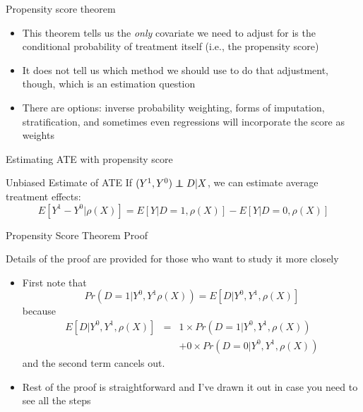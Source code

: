 \documentclass{beamer}
\newcommand\independent{\protect\mathpalette{\protect\independenT}{\perp}}
\def\independenT#1#2{\mathrel{\rlap{$#1#2$}\mkern2mu{#1#2}}}
\begin{document}
\begin{frame}{Propensity score theorem}
	
	\begin{itemize}
	\item This theorem tells us the \emph{only} covariate we need to adjust for is the conditional probability of treatment itself (i.e., the propensity score)
	\item It does not tell us which method we should use to do that adjustment, though, which is an estimation question
	\item There are options: inverse probability weighting, forms of imputation, stratification, and sometimes even regressions will incorporate the score as weights
	\end{itemize}
\end{frame}



\begin{frame}{Estimating ATE with propensity score}

	\begin{block}{Unbiased Estimate of ATE}
	If $(Y^1,Y^0)\independent{D}|X$, we can estimate average treatment effects:
 $$E[Y^1-Y^0|\rho(X)] = E[Y|D=1,\rho(X)] - E[Y|D=0,\rho(X)]$$
	\end{block}


	
\end{frame}


\begin{frame}{Propensity Score Theorem Proof}
	
	 Details of the proof are provided for those who want to study it more closely
	\begin{itemize}
	\item First note that$$Pr(D=1|Y^0,Y^1\rho(X)) = E[D | Y^0,Y^1,\rho(X)]$$because
		\begin{eqnarray*}
		E[D|Y^0,Y^1,\rho(X)] &=& 1\times Pr(D=1|Y^0,Y^1,\rho(X)) \\
		& & + 0 \times Pr(D=0 | Y^0,Y^1,\rho(X))
		\end{eqnarray*}and the second term cancels out.
	\item Rest of the proof is straightforward and I've drawn it out in case you need to see all the steps
	\end{itemize}
\end{frame}
\end{document}
